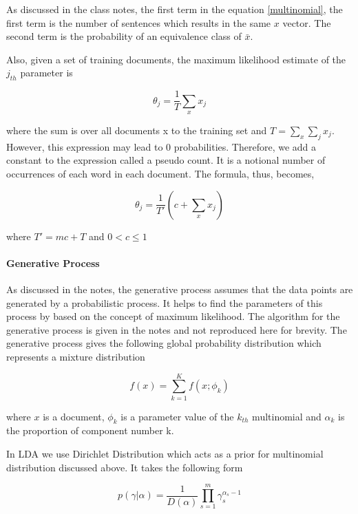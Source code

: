 \documentclass[11pt,a4paper,oneside]{article}
\begin{document}
As discussed in the class notes, the first term in the equation \ref{multinomial}, the first term is the number of sentences which results in the same $x$ vector. The second term is the probability of an equivalence class of $\bar{x}$.

Also, given a set of training documents, the maximum likelihood estimate of the $j_{th}$ parameter is

\begin{equation}
\theta_j = \frac{1}{T} \sum_x x_j
\end{equation}

where the sum is over all documents x to the training set and $T = \sum_x{\sum_j{x_j}} $. However, this expression may lead to $0$ probabilities. Therefore, we add a constant to the expression called a pseudo count. It is a notional number of occurrences of each word in each document. The formula, thus, becomes,

\begin{equation}
\theta_j = \frac{1}{T'} (c + \sum_x x_j)
\end{equation}

where $T' = mc + T$ and $0 < c \leq 1 $

\paragraph{Generative Process}
As discussed in the notes, the generative process assumes that the data points are generated by a probabilistic process. It helps to find the parameters of this process by based on the concept of maximum likelihood. The algorithm for the generative process is given in the notes\cite{classNotes} and not reproduced here for brevity. The generative process gives the following global probability distribution which represents a mixture distribution

\begin{equation}
f(x) = \sum^K_{k=1}f(x;\phi_k)
\end{equation}

where $x$ is a document, $\phi_k$ is a parameter value of the $k_{th}$ multinomial and $\alpha_k$ is the proportion of component number k.

In LDA we use Dirichlet Distribution which acts as a prior for multinomial distribution discussed above. It takes the following form \cite{classNotes}

\begin{equation}
p(\gamma|\alpha) = \frac{1}{D(\alpha)}\prod^m_{s=1}\gamma^{\alpha_s - 1}_s
\end{equation}
\end{document}
